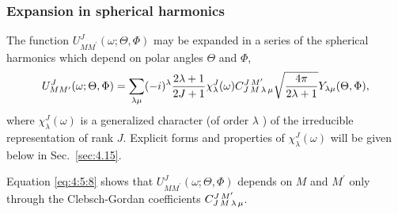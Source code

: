 \subsubsection{Expansion in spherical harmonics} 
The function $U_{M M^{\prime}}^{J}(\omega ; \Theta, \Phi)$ may be expanded in a series of the spherical harmonics which depend on polar angles $\Theta$ and $\Phi$,
\begin{equation}
U_{M M^{\prime}}^{J}(\omega ; \Theta, \Phi)=\sum_{\lambda \mu}(-i)^{\lambda} \frac{2 \lambda+1}{2 J+1} \chi_{\lambda}^{J}(\omega) C_{J\,M\,\lambda\,\mu}^{J\,M^{\prime}} \sqrt{\frac{4 \pi}{2 \lambda+1}} Y_{\lambda \mu}(\Theta, \Phi) ,\label{eq:4:5:8}
\end{equation}
where $\chi_{\lambda}^{J}(\omega)$ is a generalized character (of order $\lambda$ ) of the irreducible representation of rank $J$. Explicit forms and properties of $\chi_{\lambda}^{J}(\omega)$ will be given below in Sec.~\ref{sec:4.15}.

Equation \eqref{eq:4:5:8} shows that $U_{M M^{\prime}}^{J}(\omega ; \Theta, \Phi)$ depends on $M$ and $M^{\prime}$ only through the Clebsch-Gordan coefficients $C_{J\,M\,\lambda\,\mu}^{J\,M^{\prime}}$.

